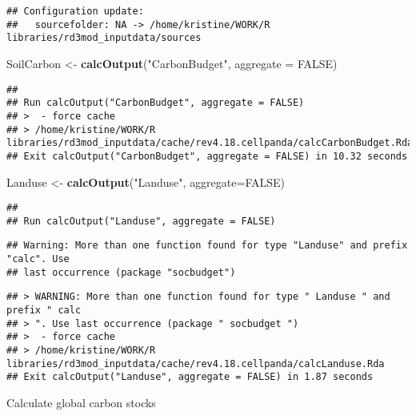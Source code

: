 \documentclass[
]{article}
\newenvironment{Shaded}{\begin{snugshade}}{\end{snugshade}}
\newcommand{\DataTypeTok}[1]{\textcolor[rgb]{0.13,0.29,0.53}{#1}}
\newcommand{\KeywordTok}[1]{\textcolor[rgb]{0.13,0.29,0.53}{\textbf{#1}}}
\newcommand{\NormalTok}[1]{#1}
\newcommand{\OtherTok}[1]{\textcolor[rgb]{0.56,0.35,0.01}{#1}}
\newcommand{\StringTok}[1]{\textcolor[rgb]{0.31,0.60,0.02}{#1}}
\begin{document}
\begin{verbatim}
## Configuration update:
##   sourcefolder: NA -> /home/kristine/WORK/R libraries/rd3mod_inputdata/sources
\end{verbatim}

\begin{Shaded}
\begin{Highlighting}[]
\NormalTok{SoilCarbon <{-}}\StringTok{ }\KeywordTok{calcOutput}\NormalTok{(}\StringTok{"CarbonBudget"}\NormalTok{, }\DataTypeTok{aggregate =} \OtherTok{FALSE}\NormalTok{)}
\end{Highlighting}
\end{Shaded}

\begin{verbatim}
## 
## Run calcOutput("CarbonBudget", aggregate = FALSE)
## >  - force cache 
## > /home/kristine/WORK/R libraries/rd3mod_inputdata/cache/rev4.18.cellpanda/calcCarbonBudget.Rda
## Exit calcOutput("CarbonBudget", aggregate = FALSE) in 10.32 seconds
\end{verbatim}

\begin{Shaded}
\begin{Highlighting}[]
\NormalTok{Landuse    <{-}}\StringTok{ }\KeywordTok{calcOutput}\NormalTok{(}\StringTok{"Landuse"}\NormalTok{,      }\DataTypeTok{aggregate=}\OtherTok{FALSE}\NormalTok{)}
\end{Highlighting}
\end{Shaded}

\begin{verbatim}
## 
## Run calcOutput("Landuse", aggregate = FALSE)
\end{verbatim}

\begin{verbatim}
## Warning: More than one function found for type "Landuse" and prefix "calc". Use
## last occurrence (package "socbudget")
\end{verbatim}

\begin{verbatim}
## > WARNING: More than one function found for type " Landuse " and prefix " calc 
## > ". Use last occurrence (package " socbudget ")
## >  - force cache 
## > /home/kristine/WORK/R libraries/rd3mod_inputdata/cache/rev4.18.cellpanda/calcLanduse.Rda
## Exit calcOutput("Landuse", aggregate = FALSE) in 1.87 seconds
\end{verbatim}

Calculate global carbon stocks
\end{document}
